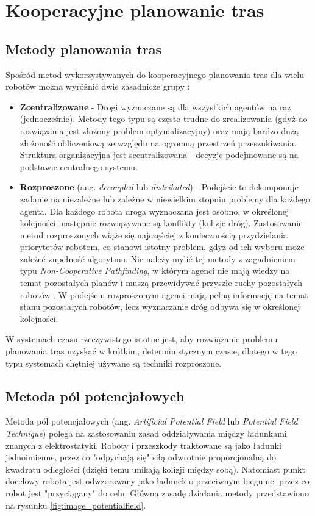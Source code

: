 \chapter{Kooperacyjne planowanie tras}
\label{ch:cooperative_pathfinding}

\section{Metody planowania tras}
Spośród metod wykorzystywanych do kooperacyjnego planowania tras dla wielu robotów można wyróżnić dwie zasadnicze grupy \cite{latombe}:
\begin{itemize}
	\item {\bf Zcentralizowane} - Drogi wyznaczane są dla wszystkich agentów na raz (jednocześnie). Metody tego typu są często trudne do zrealizowania (gdyż do rozwiązania jest złożony problem optymalizacyjny) oraz mają bardzo dużą złożoność obliczeniową ze względu na ogromną przestrzeń przeszukiwania. Struktura organizacyjna jest scentralizowana - decyzje podejmowane są na podstawie centralnego systemu.
	\item {\bf Rozproszone} (ang. {\it decoupled} lub {\it distributed}) - Podejście to dekomponuje zadanie na niezależne lub zależne w niewielkim stopniu problemy dla każdego agenta. Dla każdego robota droga wyznaczana jest osobno, w określonej kolejności, następnie rozwiązywane są konflikty (kolizje dróg).
	Zastosowanie metod rozproszonych wiąże się najczęściej z koniecznością przydzielania priorytetów robotom, co stanowi istotny problem, gdyż od ich wyboru może zależeć zupełność algorytmu. Nie należy mylić tej metody z zagadnieniem typu {\it Non-Cooperative Pathfinding}, w którym agenci nie mają wiedzy na temat pozostałych planów i muszą przewidywać przyszłe ruchy pozostałych robotów \cite{cooppath}. W podejściu rozproszonym agenci mają pełną informację na temat stanu pozostałych robotów, lecz wyznaczanie dróg odbywa się w określonej kolejności.
\end{itemize}

W systemach czasu rzeczywistego istotne jest, aby rozwiązanie problemu planowania tras uzyskać w krótkim, deterministycznym czasie, dlatego w tego typu systemach chętniej używane są techniki rozproszone.

\section{Metoda pól potencjałowych}
Metoda pól potencjałowych (ang. {\it Artificial Potential Field} lub {\it Potential Field Technique}) polega na zastosowaniu zasad oddziaływania między ładunkami znanych z elektrostatyki. Roboty i przeszkody traktowane są jako ładunki jednoimienne, przez co "odpychają się" siłą odwrotnie proporcjonalną do kwadratu odległości (dzięki temu unikają kolizji między sobą). Natomiast punkt docelowy robota jest odwzorowany jako ładunek o przeciwnym biegunie, przez co robot jest "przyciągany" do celu.
Główną zasadę działania metody przedstawiono na rysunku \ref{fig:image_potentialfield}.

